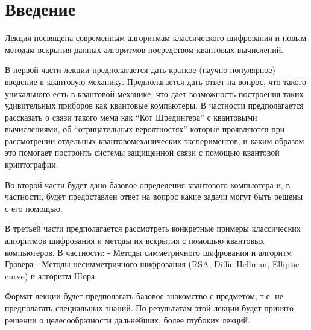 \section{Введение}
Лекция посвящена современным алгоритмам классического шифрования и новым
методам вскрытия данных алгоритмов посредством квантовых вычислений. 

В первой части лекции предполагается дать краткое (научно популярное)
введение в квантовую механику. Предполагается дать ответ на вопрос,
что такого уникального есть в квантовой механике, что дает возможность
построения таких удивительных приборов как квантовые компьютеры. 
В частности предполагается рассказать о связи такого мема как ``Кот
Шредингера'' с квантовыми вычислениями, об ``отрицательных
вероятностях'' которые проявляются при рассмотрении отдельных
квантовомеханических экспериментов, и каким образом это помогает построить
системы защищенной связи с помощью квантовой криптографии.

Во второй части будет дано базовое определения квантового
компьютера и, в частности, будет предоставлен ответ на вопрос какие
задачи могут быть решены с его помощью.

В третьей части предполагается рассмотреть конкретные примеры
классических алгоритмов шифрования и методы их вскрытия с помощью квантовых
компьютеров. В частности:
- Методы симметричного шифрования и алгоритм Гровера
- Методы несимметричного шифрования (RSA, Diffie-Hellman, Elliptic
curve) и алгоритм Шора.

Формат лекции будет предполагать базовое знакомство с предметом, т.е.
не предполагать специальных знаний. По результатам этой лекции будет
принято решении о целесообразности дальнейших, более глубоких лекций.
